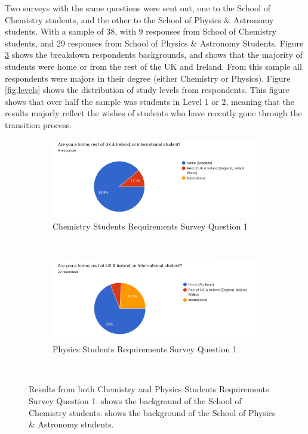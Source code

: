 \documentclass{l4proj}
\begin{document}
Two surveys with the same questions were sent out,  one to the School of Chemistry students,  and the other to the School of Physics \& Astronomy students. With a sample of 38,  with 9 responses from School of Chemistry students,  and 29 responses from School of Physics \& Astronomy Students. Figure \ref{fig:background} shows the breakdown respondents backgrounds,  and shows that the majority of students were home or from the rest of the UK and Ireland. From this sample all respondents were majors in their degree (either Chemistry or Physics). Figure \ref{fig:levels} shows the distribution of study levels from respondents. This figure shows that over half the sample was students in Level 1 or 2,  meaning that the results majorly reflect the wishes of students who have recently gone through the transition process.

\begin{figure}[h]
    \centering
    \begin{subfigure}[b]{0.6\textwidth}
        \includegraphics[width=\textwidth]{images/backgroundChem.pdf}
        \caption{Chemistry Students Requirements Survey Question 1}
        \label{fig:syn1}
    \end{subfigure}
    ~ %
    \begin{subfigure}[b]{0.6\textwidth}
        \includegraphics[width=\textwidth]{images/backgroundPhys.pdf}
        \caption{Physics Students Requirements Survey Question 1}
        \label{fig:syn2}
    \end{subfigure}
    ~ %
    \caption{Results from both Chemistry and Physics Students Requirements Survey Question 1.  shows the background of the School of Chemistry students.  shows the background of the School of Physics \& Astronomy students.
    }\label{fig:background}
\end{figure}
\end{document}
